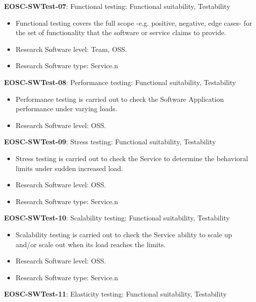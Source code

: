 \textbf{EOSC-SWTest-07}: Functional testing: Functional suitability, Testability

\begin{itemize}
    \item Functional testing covers the full scope -e.g. positive, negative, edge cases- for the set of functionality that the software or service claims to provide. \cite{iso_25010_2011_2017,orviz_fernandez_eosc-synergy_2020}
    \item Research Software level: Team, OSS.
    \item Research Software type: Service.n\end{itemize}

\textbf{EOSC-SWTest-08}: Performance testing: Functional suitability, Testability

\begin{itemize}
    \item Performance testing is carried out to check the Software Application performance under varying loads. \cite{iso_25010_2011_2017,orviz_fernandez_eosc-synergy_2020}
    \item Research Software level: OSS.
\end{itemize}

\textbf{EOSC-SWTest-09}: Stress testing: Functional suitability, Testability

\begin{itemize}
    \item Stress testing is carried out to check the Service to determine the behavioral limits under sudden increased load. \cite{orviz_fernandez_eosc-synergy_2020}
    \item Research Software level: OSS.
    \item Research Software type: Service.n\end{itemize}

\textbf{EOSC-SWTest-10}: Scalability testing: Functional suitability, Testability

\begin{itemize}
    \item Scalability testing is carried out to check the Service ability to scale up and/or scale out when its load reaches the limits. \cite{orviz_fernandez_eosc-synergy_2020}
    \item Research Software level: OSS.
    \item Research Software type: Service.n\end{itemize}

\textbf{EOSC-SWTest-11}: Elasticity testing: Functional suitability, Testability

